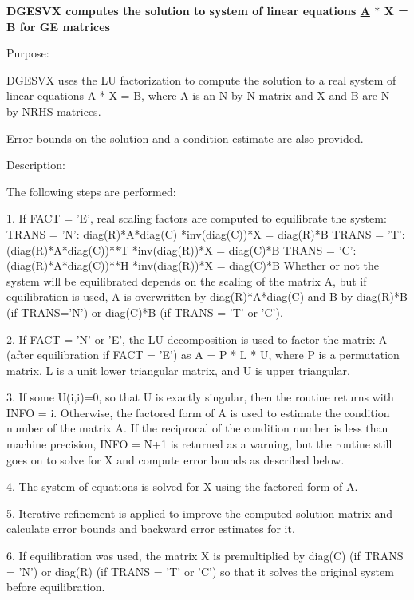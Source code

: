 {\bfseries  D\+G\+E\+S\+V\+X computes the solution to system of linear equations \hyperlink{classA}{A} $\ast$ X = B for G\+E matrices} 

 \begin{DoxyParagraph}{Purpose\+: }
\begin{DoxyVerb} DGESVX uses the LU factorization to compute the solution to a real
 system of linear equations
    A * X = B,
 where A is an N-by-N matrix and X and B are N-by-NRHS matrices.

 Error bounds on the solution and a condition estimate are also
 provided.\end{DoxyVerb}
 
\end{DoxyParagraph}
\begin{DoxyParagraph}{Description\+: }
\begin{DoxyVerb} The following steps are performed:

 1. If FACT = 'E', real scaling factors are computed to equilibrate
    the system:
       TRANS = 'N':  diag(R)*A*diag(C)     *inv(diag(C))*X = diag(R)*B
       TRANS = 'T': (diag(R)*A*diag(C))**T *inv(diag(R))*X = diag(C)*B
       TRANS = 'C': (diag(R)*A*diag(C))**H *inv(diag(R))*X = diag(C)*B
    Whether or not the system will be equilibrated depends on the
    scaling of the matrix A, but if equilibration is used, A is
    overwritten by diag(R)*A*diag(C) and B by diag(R)*B (if TRANS='N')
    or diag(C)*B (if TRANS = 'T' or 'C').

 2. If FACT = 'N' or 'E', the LU decomposition is used to factor the
    matrix A (after equilibration if FACT = 'E') as
       A = P * L * U,
    where P is a permutation matrix, L is a unit lower triangular
    matrix, and U is upper triangular.

 3. If some U(i,i)=0, so that U is exactly singular, then the routine
    returns with INFO = i. Otherwise, the factored form of A is used
    to estimate the condition number of the matrix A.  If the
    reciprocal of the condition number is less than machine precision,
    INFO = N+1 is returned as a warning, but the routine still goes on
    to solve for X and compute error bounds as described below.

 4. The system of equations is solved for X using the factored form
    of A.

 5. Iterative refinement is applied to improve the computed solution
    matrix and calculate error bounds and backward error estimates
    for it.

 6. If equilibration was used, the matrix X is premultiplied by
    diag(C) (if TRANS = 'N') or diag(R) (if TRANS = 'T' or 'C') so
    that it solves the original system before equilibration.\end{DoxyVerb}
 
\end{DoxyParagraph}

